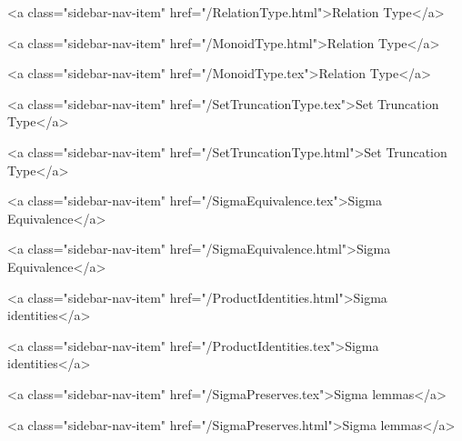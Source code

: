       
    
      
        
          <a class="sidebar-nav-item" href="/RelationType.html">Relation Type</a>
        
      
    
      
        
          <a class="sidebar-nav-item" href="/MonoidType.html">Relation Type</a>
        
      
    
      
        
          <a class="sidebar-nav-item" href="/MonoidType.tex">Relation Type</a>
        
      
    
      
        
          <a class="sidebar-nav-item" href="/SetTruncationType.tex">Set Truncation Type</a>
        
      
    
      
        
          <a class="sidebar-nav-item" href="/SetTruncationType.html">Set Truncation Type</a>
        
      
    
      
        
          <a class="sidebar-nav-item" href="/SigmaEquivalence.tex">Sigma Equivalence</a>
        
      
    
      
        
          <a class="sidebar-nav-item" href="/SigmaEquivalence.html">Sigma Equivalence</a>
        
      
    
      
        
          <a class="sidebar-nav-item" href="/ProductIdentities.html">Sigma identities</a>
        
      
    
      
        
          <a class="sidebar-nav-item" href="/ProductIdentities.tex">Sigma identities</a>
        
      
    
      
        
          <a class="sidebar-nav-item" href="/SigmaPreserves.tex">Sigma lemmas</a>
        
      
    
      
        
          <a class="sidebar-nav-item" href="/SigmaPreserves.html">Sigma lemmas</a>
        
